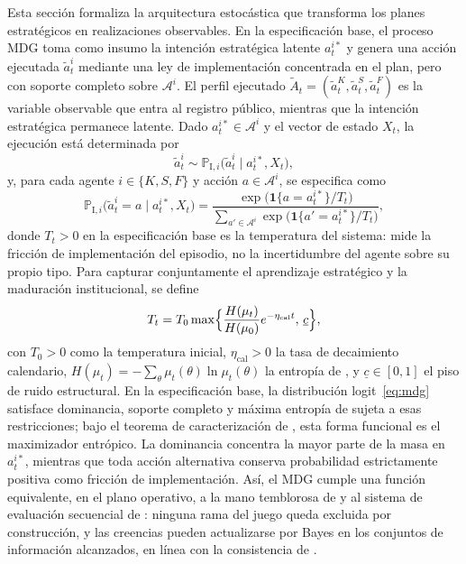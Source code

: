 \documentclass[review,authoryear,12pt]{elsarticle}
\theoremstyle{plain}
\theoremstyle{definition}
\newcommand{\1}{\mathbf{1}}
\newcommand{\ProbI}[1]{\mathbb{P}_{\mathrm{I},#1}}
\begin{document}
Esta sección formaliza la arquitectura estocástica que transforma los planes estratégicos en realizaciones observables. En la especificación base, el proceso MDG toma como insumo la intención estratégica latente $a_t^{i\ast}$ y genera una acción ejecutada $\tilde{a}_t^i$ mediante una ley de implementación concentrada en el plan, pero con soporte completo sobre $\mathcal{A}^i$. El perfil ejecutado $\tilde{A}_t=(\tilde{a}_t^K,\tilde{a}_t^S,\tilde{a}_t^F)$ es la variable observable que entra al registro público, mientras que la intención estratégica permanece latente. Dado $a_t^{i\ast}\in\mathcal{A}^i$ y el vector de estado $X_t$, la ejecución está determinada por
\[
\tilde{a}_t^i\sim\ProbI{i}\bigl(\tilde{a}_t^i\mid a_t^{i\ast},X_t\bigr),
\]
y, para cada agente $i\in\{K,S,F\}$ y acción $a\in\mathcal{A}^i$, se especifica como
\begin{equation}
\ProbI{i}\bigl(\tilde{a}_t^i=a\mid a_t^{i\ast},X_t\bigr)
=\frac{\exp\bigl(\mathbf{1}\{a=a_t^{i\ast}\}/T_t\bigr)}{\sum_{a'\in\mathcal{A}^i}\exp\bigl(\mathbf{1}\{a'=a_t^{i\ast}\}/T_t\bigr)},
\label{eq:mdg}
\end{equation}
donde $T_t>0$ en la especificación base es la temperatura del sistema: mide la fricción de implementación del episodio, no la incertidumbre del agente sobre su propio tipo. Para capturar conjuntamente el aprendizaje estratégico y la maduración institucional, se define
\begin{equation}
T_t=T_0\max\Bigl\{\frac{H(\mu_t)}{H(\mu_0)}e^{-\eta_{\mathrm{cal}}t},\,\underline{c}\Bigr\},
\label{eq:temperature}
\end{equation}
con $T_0>0$ como la temperatura inicial, $\eta_{\mathrm{cal}}>0$ la tasa de decaimiento calendario, $H(\mu_t)=-\sum_\theta\mu_t(\theta)\ln\mu_t(\theta)$ la entropía de \citet{Shannon1948}, y $\underline{c}\in[0,1]$ el piso de ruido estructural. En la especificación base, la distribución logit~\eqref{eq:mdg} satisface dominancia, soporte completo y máxima entropía de \citet{Shannon1948} sujeta a esas restricciones; bajo el teorema de caracterización de \citet{Jaynes1957Information}, esta forma funcional es el maximizador entrópico. La dominancia concentra la mayor parte de la masa en $a_t^{i\ast}$, mientras que toda acción alternativa conserva probabilidad estrictamente positiva como fricción de implementación. Así, el MDG cumple una función equivalente, en el plano operativo, a la mano temblorosa de \citet{Selten1975Perfectness} y al sistema de evaluación secuencial de \citet{KrepsWilson1982}: ninguna rama del juego queda excluida por construcción, y las creencias pueden actualizarse por Bayes en los conjuntos de información alcanzados, en línea con la consistencia de \citet{FudenbergTirole1991PBE}.
\end{document}
